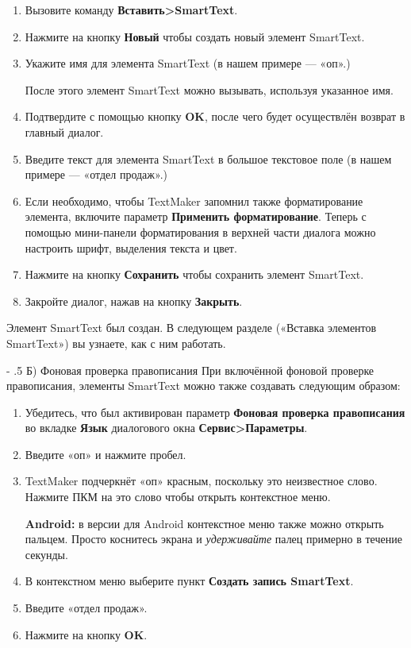 ﻿\documentclass[a4paper,10pt]{article}
\makeatletter
\renewcommand\paragraph{%
   \@startsection{paragraph}{4}{0mm}%
      {-\baselineskip}%
      {.5\baselineskip}%
      {\normalfont\normalsize\bfseries}}
\makeatother
\begin{document}
\begin{enumerate}
 \item Вызовите команду \textbf{Вставить>SmartText}.
 \item Нажмите на кнопку \textbf{Новый} чтобы создать новый элемент SmartText.
 \item Укажите имя для элемента SmartText (в нашем примере — «оп».)
 
 После этого элемент SmartText можно вызывать, используя указанное имя.
 \item Подтвердите с помощью кнопку \textbf{OK}, после чего будет осуществлён возврат в главный диалог.
 \item Введите текст для элемента SmartText в большое текстовое поле (в нашем примере — «отдел продаж».)
 \item Если необходимо, чтобы TextMaker запомнил также форматирование элемента, включите параметр \textbf{Применить форматирование}. Теперь с помощью мини-панели форматирования в верхней части диалога можно настроить шрифт, выделения текста и цвет.
 \item Нажмите на кнопку \textbf{Сохранить} чтобы сохранить элемент SmartText.
 \item Закройте диалог, нажав на кнопку \textbf{Закрыть}.
\end{enumerate}

Элемент SmartText был создан. В следующем разделе («Вставка элементов SmartText») вы узнаете, как с ним работать.

\paragraph{Б) Фоновая проверка правописания}
При включённой фоновой проверке правописания, элементы SmartText можно также создавать следующим образом:
\begin{enumerate}
 \item Убедитесь, что был активирован параметр \textbf{Фоновая проверка правописания} во вкладке \textbf{Язык} диалогового окна \textbf{Сервис>Параметры}.
 \item Введите «оп» и нажмите пробел.
 \item TextMaker подчеркнёт «оп» красным, поскольку это неизвестное слово. Нажмите ПКМ на это слово чтобы открыть контекстное меню.
 
 \textbf{Android:} в версии для Android контекстное меню также можно открыть пальцем. Просто коснитесь экрана и \textit{удерживайте} палец примерно в течение секунды.
 \item В контекстном меню выберите пункт \textbf{Создать запись SmartText}.
 \item Введите «отдел продаж».
 \item Нажмите на кнопку \textbf{OK}.
\end{enumerate}
\end{document}
